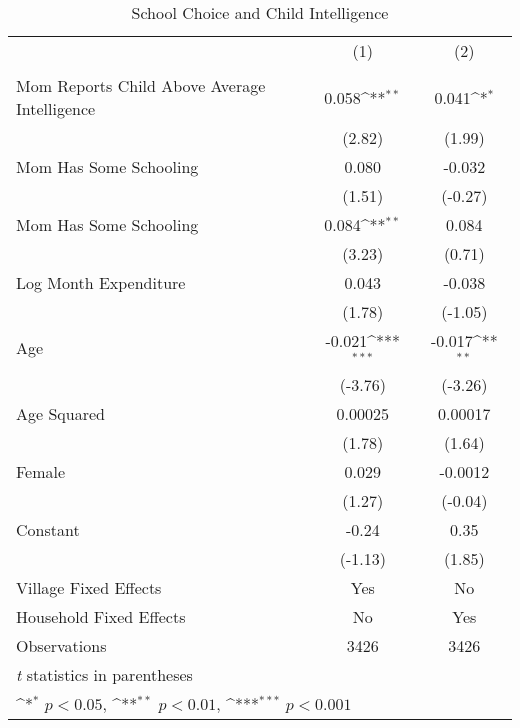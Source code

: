 \begin{table}[htbp]\centering
\def\sym#1{\ifmmode^{#1}\else\(^{#1}\)\fi}
\caption{School Choice and Child Intelligence\label{hhselection}}
\begin{tabular}{l*{2}{c}}
\hline\hline
                &\multicolumn{1}{c}{(1)}&\multicolumn{1}{c}{(2)}\\
                &\multicolumn{1}{c}{}&\multicolumn{1}{c}{}\\
\hline
Mom Reports Child Above Average Intelligence&    0.058\sym{**} &    0.041\sym{*}  \\
                &   (2.82)         &   (1.99)         \\
Mom Has Some Schooling&    0.080         &   -0.032         \\
                &   (1.51)         &  (-0.27)         \\
Mom Has Some Schooling&    0.084\sym{**} &    0.084         \\
                &   (3.23)         &   (0.71)         \\
Log Month Expenditure&    0.043         &   -0.038         \\
                &   (1.78)         &  (-1.05)         \\
Age             &   -0.021\sym{***}&   -0.017\sym{**} \\
                &  (-3.76)         &  (-3.26)         \\
Age Squared     &  0.00025         &  0.00017         \\
                &   (1.78)         &   (1.64)         \\
Female          &    0.029         &  -0.0012         \\
                &   (1.27)         &  (-0.04)         \\
Constant        &    -0.24         &     0.35         \\
                &  (-1.13)         &   (1.85)         \\
Village Fixed Effects&      Yes         &       No         \\
Household Fixed Effects&       No         &      Yes         \\
\hline
Observations    &     3426         &     3426         \\
\hline\hline
\multicolumn{3}{l}{\footnotesize \textit{t} statistics in parentheses}\\
\multicolumn{3}{l}{\footnotesize \sym{*} \(p<0.05\), \sym{**} \(p<0.01\), \sym{***} \(p<0.001\)}\\
\end{tabular}
\end{table}
